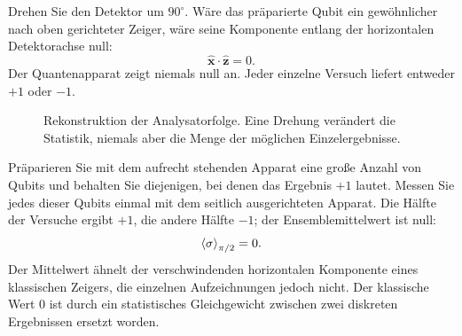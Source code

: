 Drehen Sie den Detektor um \(90^\circ\). Wäre das präparierte Qubit ein gewöhnlicher nach oben gerichteter Zeiger, wäre seine Komponente entlang der horizontalen Detektorachse null:
\begin{equation}
  \hat{\mathbf x}\cdot\hat{\mathbf z}=0.
\end{equation}
Der Quantenapparat zeigt niemals null an. Jeder einzelne Versuch liefert entweder \(+1\) oder \(-1\).

\begin{figure}[htbp]
  \centering
  \caption{Rekonstruktion der Analysatorfolge. Eine Drehung verändert die Statistik, niemals aber die Menge der möglichen Einzelergebnisse.}
\end{figure}

Präparieren Sie mit dem aufrecht stehenden Apparat eine große Anzahl von Qubits und behalten Sie diejenigen, bei denen das Ergebnis \(+1\) lautet. Messen Sie jedes dieser Qubits einmal mit dem seitlich ausgerichteten Apparat. Die Hälfte der Versuche ergibt \(+1\), die andere Hälfte \(-1\); der Ensemblemittelwert ist null:
\begin{equation}
  \left\langle\sigma\right\rangle_{\pi/2}=0.
\end{equation}
Der Mittelwert ähnelt der verschwindenden horizontalen Komponente eines klassischen Zeigers, die einzelnen Aufzeichnungen jedoch nicht. Der klassische Wert \(0\) ist durch ein statistisches Gleichgewicht zwischen zwei diskreten Ergebnissen ersetzt worden.

